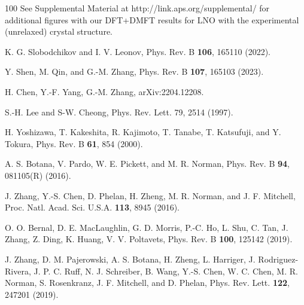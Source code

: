 \documentclass[prl,twocolumn,preprintnumbers,superscriptaddress]{revtex4-1}
\begin{document}
\begin{thebibliography}{100}
See Supplemental Material at http://link.aps.org/supplemental/ for additional figures with our DFT+DMFT results for LNO with the experimental (unrelaxed) crystal structure.


K. G. Slobodchikov and I. V. Leonov, Phys. Rev. B \textbf{106}, 165110 (2022).

Y. Shen, M. Qin, and G.-M. Zhang, Phys. Rev. B \textbf{107}, 165103 (2023).

H. Chen, Y.-F. Yang, G.-M. Zhang, arXiv:2204.12208.



S.-H. Lee and S-W. Cheong, Phys. Rev. Lett. 79, 2514 (1997).

H. Yoshizawa, T. Kakeshita, R. Kajimoto, T. Tanabe, T. Katsufuji, and Y. Tokura, Phys. Rev. B \textbf{61}, 854 (2000).


A. S. Botana, V. Pardo, W. E. Pickett, and M. R. Norman,
Phys. Rev. B \textbf{94}, 081105(R) (2016).

J. Zhang, Y.-S. Chen, D. Phelan, H. Zheng, M. R. Norman, and J. F. Mitchell, Proc. Natl. Acad. Sci. U.S.A. \textbf{113}, 8945 (2016).

O. O. Bernal, D. E. MacLaughlin, G. D. Morris, P.-C. Ho, L. Shu, C. Tan, J. Zhang, Z. Ding, K. Huang, V. V. Poltavets, Phys. Rev. B \textbf{100}, 125142 (2019).

J. Zhang, D. M. Pajerowski, A. S. Botana, H. Zheng, L. Harriger, J. Rodriguez-Rivera, J. P. C. Ruff, N. J. Schreiber, B. Wang, Y.-S. Chen, W. C. Chen, M. R. Norman, S. Rosenkranz, J. F. Mitchell, and D. Phelan, Phys. Rev. Lett. \textbf{122}, 247201 (2019).


\end{thebibliography}
\end{document}
